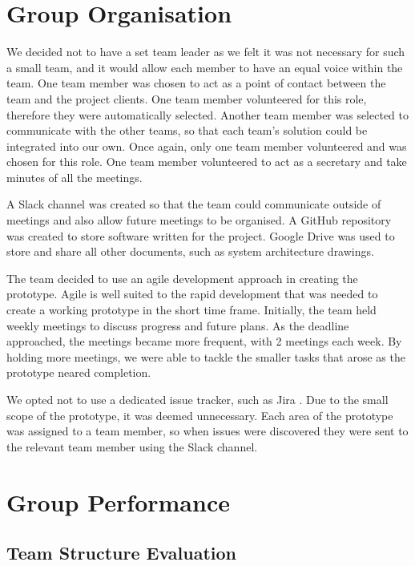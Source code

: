 

\section{Group Organisation}
We decided not to have a set team leader as we felt it was not necessary for such a small team, and it would allow each member to have an equal voice within the team.  One team member was chosen to act as a point of contact between the team and the project clients. One team member volunteered for this role, therefore they were automatically selected. Another team member was selected to communicate with the other teams, so that each team's solution could be integrated into our own. Once again, only one team member volunteered and was chosen for this role. One team member volunteered to act as a secretary and take minutes of all the meetings.

A Slack \cite{slack} channel was created so that the team could communicate outside of meetings and also allow future meetings to be organised. A GitHub \cite{github} repository was created to store software written for the project. Google Drive \cite{googledrive} was used to store and share all other documents, such as system architecture drawings.

The team decided to use an agile development approach in creating the prototype. Agile is well suited to the rapid development that was needed to create a working prototype in the short time frame. Initially, the team held weekly meetings to discuss progress and future plans. As the deadline approached, the meetings became more frequent, with 2 meetings each week. By holding more meetings, we were able to tackle the smaller tasks that arose as the prototype neared completion.

We opted not to use a dedicated issue tracker, such as Jira \cite{jira}. Due to the small scope of the prototype, it was deemed unnecessary. Each area of the prototype was assigned to a team member, so when issues were discovered they were sent to the relevant team member using the Slack channel.

\section{Group Performance}

\subsection{Team Structure Evaluation}

